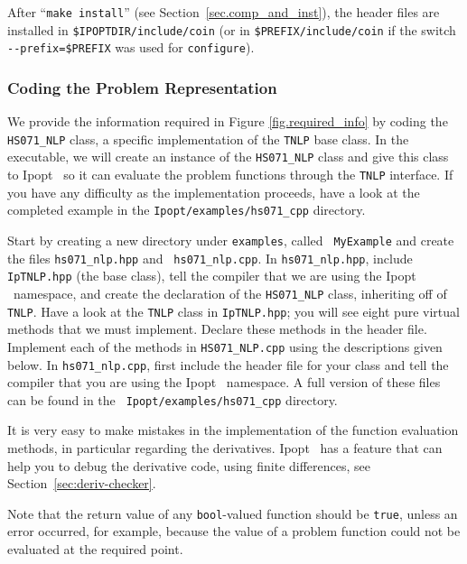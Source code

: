 \documentclass[10pt]{article}
\newcommand{\Ipopt}{{\sc Ipopt }}
\begin{document}
After ``\texttt{make install}'' (see Section~\ref{sec.comp_and_inst}),
the header files are installed in \texttt{\$IPOPTDIR/include/coin}
(or in \texttt{\$PREFIX/include/coin} if the switch
\verb|--prefix=$PREFIX| was used for {\tt configure}).

\subsubsection{Coding the Problem Representation}\label{sec.cpp_problem}
We provide the information required in Figure \ref{fig.required_info}
by coding the {\tt HS071\_NLP} class, a specific implementation of the
{\tt TNLP} base class. In the executable, we will create an instance
of the {\tt HS071\_NLP} class and give this class to \Ipopt\ so it can
evaluate the problem functions through the {\tt TNLP} interface. If
you have any difficulty as the implementation proceeds, have a look at
the completed example in the {\tt Ipopt/examples/hs071\_cpp} directory.

Start by creating a new directory under {\tt examples}, called {\tt
  MyExample} and create the files {\tt hs071\_nlp.hpp} and {\tt
  hs071\_nlp.cpp}. In {\tt hs071\_nlp.hpp}, include {\tt IpTNLP.hpp}
(the base class), tell the compiler that we are using the \Ipopt\
namespace, and create the declaration of the {\tt HS071\_NLP} class,
inheriting off of {\tt TNLP}. Have a look at the {\tt TNLP} class in
{\tt IpTNLP.hpp}; you will see eight pure virtual methods that we must
implement. Declare these methods in the header file.  Implement each
of the methods in {\tt HS071\_NLP.cpp} using the descriptions given
below. In {\tt hs071\_nlp.cpp}, first include the header file for your
class and tell the compiler that you are using the \Ipopt\ namespace.
A full version of these files can be found in the {\tt
  Ipopt/examples/hs071\_cpp} directory.

It is very easy to make mistakes in the implementation of the function
evaluation methods, in particular regarding the derivatives.  \Ipopt\
has a feature that can help you to debug the derivative code, using
finite differences, see Section~\ref{sec:deriv-checker}.

Note that the return value of any {\tt bool}-valued function should be
{\tt true}, unless an error occurred, for example, because the value of
a problem function could not be evaluated at the required point.
\end{document}

